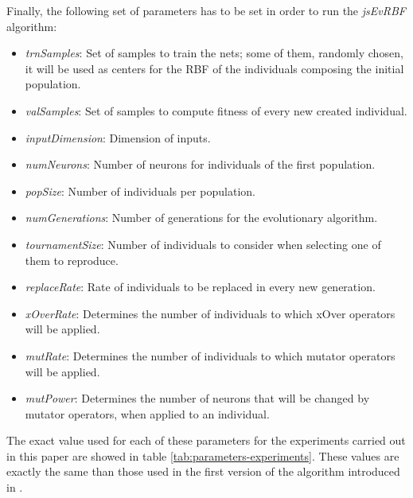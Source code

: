 \documentclass{article}
\begin{document}
Finally, the following set of parameters has to be set in
order to run the {\em jsEvRBF} algorithm: %
\begin{itemize}
\item{\em trnSamples}: Set of samples to train the nets; some of them, randomly chosen, it will be used as centers for the RBF of the individuals composing the initial population.
\item{\em valSamples}: Set of samples to compute fitness of every new created individual.
\item{\em inputDimension}: Dimension of inputs.
\item{\em numNeurons}: Number of neurons for individuals of the first population.
\item{\em popSize}: Number of individuals per population.
\item{\em numGenerations}: Number of generations for the evolutionary algorithm.
\item{\em tournamentSize}: Number of individuals to consider when selecting one of them to reproduce.
\item{\em replaceRate}: Rate of individuals to be replaced in every new generation.
\item{\em xOverRate}: Determines the number of individuals to which xOver operators will be applied.
\item{\em mutRate}: Determines the number of individuals to which mutator operators will be applied.
\item{\em mutPower}: Determines the number of neurons that will be changed by mutator operators, when applied to an individual.
\end{itemize}

The exact value used for each of these parameters for the experiments carried out in this paper are showed in table \ref{tab:parameters-experiments}. These values are exactly the same than those used in the first version of the algorithm introduced in \cite{rivas03:EvRBF}.

\end{document}
